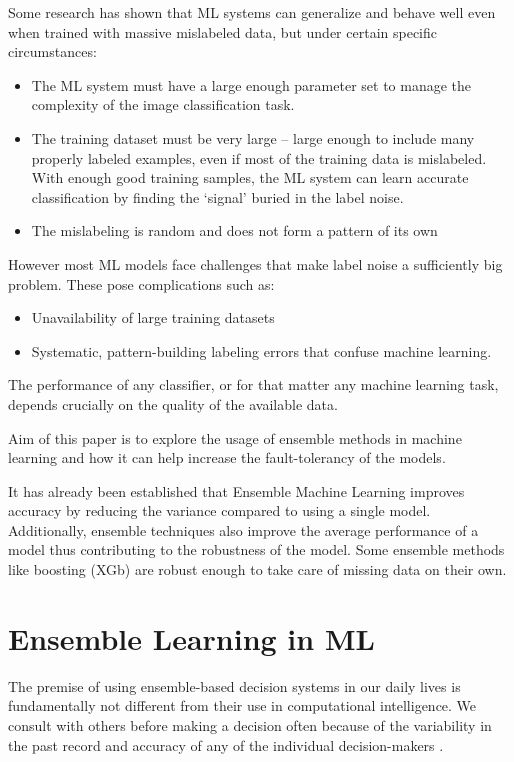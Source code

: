 \documentclass{article}
\begin{document}
Some research \cite{rolnick_veit_belongie_shavit_2018} has shown that ML systems can generalize and behave well even when trained with massive mislabeled data, but under certain specific circumstances:

\begin{itemize}
    \item The ML system must have a large enough parameter set to manage the complexity of the image classification task.  
    \item The training dataset must be very large – large enough to include many properly labeled examples, even if most of the training data is mislabeled. With enough good training samples, the ML system can learn accurate classification by finding the ‘signal’ buried in the label noise.
    \item The mislabeling is random and does not form a pattern of its own
\end{itemize}

However most ML models face challenges that make label noise a sufficiently big problem. These pose  complications such as:

\begin{itemize}
    \item Unavailability of large training datasets
    \item Systematic, pattern-building labeling errors that confuse machine learning.
\end{itemize}

The performance of any classifier, or for that matter any machine learning task, depends crucially on the quality of the available data.


Aim of this paper is to explore the usage of ensemble methods in machine learning and how it can help increase the fault-tolerancy of the models.

It has already been established that Ensemble Machine Learning improves accuracy by reducing the variance compared to using a single model. Additionally, ensemble techniques also improve the average performance of a model thus contributing to the robustness of the model. Some ensemble methods like boosting (XGb) are robust enough to take care of missing data on their own.

\section{Ensemble Learning in ML}

The premise of using ensemble-based decision systems in our daily lives is fundamentally not different from their use in computational intelligence. We consult with others before making a decision often because of the variability in the past record and accuracy of any of the individual decision-makers \cite{martin_2018}.
\end{document}
